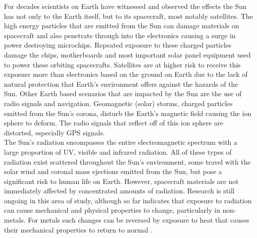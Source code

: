 \documentclass[12pt]{article}
\begin{document}
For decades scientists on Earth have witnessed and observed the effects the Sun has not only to the Earth itself, but to its spacecraft, most notably satellites. The high energy particles that are emitted from the Sun can damage materials on spacecraft and also penetrate through into the electronics causing a surge in power destroying microchips. Repeated exposure to these charged particles damage the chips, motherboards and most important solar panel equipment used to power these orbiting spacecrafts. Satellites are at higher risk to receive this exposure more than electronics based on the ground on Earth due to the lack of natural protection that Earth's environment offers against the hazards of the Sun. Other Earth based scenarios that are impacted by the Sun are the use of radio signals and navigation. Geomagnetic (solar) storms, charged particles emitted from the Sun's corona, disturb the Earth's magnetic field causing the ion sphere to deform. The radio signals that reflect off of this ion sphere are distorted, especially GPS signals. \\

The Sun's radiation encompasses the entire electromagnetic spectrum with a large proportion of UV, visible and infrared radiation. All of these types of radiation exist scattered throughout the Sun's environment, some travel with the solar wind and coronal mass ejections emitted from the Sun, but pose a significant risk to human life on Earth. However, spacecraft materials are not immediately affected by concentrated amounts of radiation. Research is still ongoing in this area of study, although so far indicates that exposure to radiation can cause mechanical and physical properties to change, particularly in non-metals. For metals such changes can be reversed by exposure to heat that causes their mechanical properties to return to normal \cite{DamageToMaterials}. \\
\end{document}
